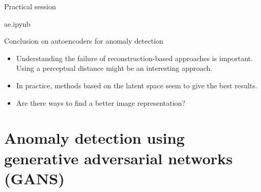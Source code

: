 \documentclass[xcolor=pdftex,dvipsnames,table,mathserif]{beamer}
\begin{document}
\begin{frame}{Practical session}

\begin{alertblock}{}
  ae.ipynb
\end{alertblock}

\end{frame}


\begin{frame}{Conclusion on autoencoders for anomaly detection}

  \begin{itemize}
  \item Understanding the failure of reconstruction-based approaches is important. Using a perceptual distance might be an interesting approach.
  \item In practice, methods based on the latent space seem to give the best results.
  \item Are there ways to find a better image representation?
  \end{itemize}

\end{frame}


\section{Anomaly detection using generative adversarial networks (GANS)}
\end{document}
